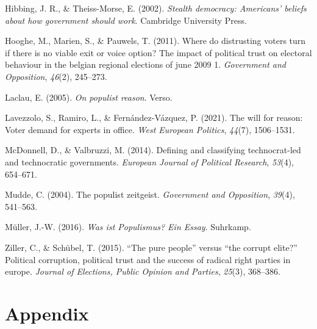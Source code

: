 \documentclass[
  12pt,
  english,
]{article}
\newlength{\cslhangindent}
\newlength{\cslentryspacingunit} %
\newenvironment{CSLReferences}[2] %
 {%
  \setlength{\parindent}{0pt}
  \ifodd #1
  \let\oldpar\par
  \def\par{\hangindent=\cslhangindent\oldpar}
  \fi
  \setlength{\parskip}{#2\cslentryspacingunit}
 }%
 {}
\begin{document}
\begin{CSLReferences}{1}{0}
\leavevmode{}%
Hibbing, J. R., \& Theiss-Morse, E. (2002). \emph{Stealth democracy:
Americans' beliefs about how government should work}. Cambridge
University Press.

\leavevmode{}%
Hooghe, M., Marien, S., \& Pauwels, T. (2011). Where do distrusting
voters turn if there is no viable exit or voice option? The impact of
political trust on electoral behaviour in the belgian regional elections
of june 2009 1. \emph{Government and Opposition}, \emph{46}(2),
245--273.

\leavevmode{}%
Laclau, E. (2005). \emph{On populist reason}. Verso.

\leavevmode{}%
Lavezzolo, S., Ramiro, L., \& Fernández-Vázquez, P. (2021). The will for
reason: Voter demand for experts in office. \emph{West European
Politics}, \emph{44}(7), 1506--1531.

\leavevmode{}%
McDonnell, D., \& Valbruzzi, M. (2014). Defining and classifying
technocrat-led and technocratic governments. \emph{European Journal of
Political Research}, \emph{53}(4), 654--671.

\leavevmode{}%
Mudde, C. (2004). The populist zeitgeist. \emph{Government and
Opposition}, \emph{39}(4), 541--563.

\leavevmode{}%
Müller, J.-W. (2016). \emph{Was ist {Populismus}? Ein {Essay}}.
Suhrkamp.

\leavevmode{}%
Ziller, C., \& Schübel, T. (2015). {``The pure people''} versus {``the
corrupt elite?''} Political corruption, political trust and the success
of radical right parties in europe. \emph{Journal of Elections, Public
Opinion and Parties}, \emph{25}(3), 368--386.

\end{CSLReferences}

\newpage{}

\hypertarget{appendix}{%
\section{Appendix}\label{appendix}}
\end{document}
